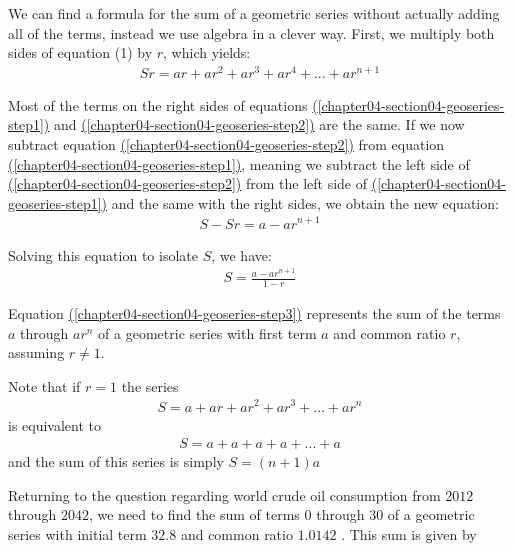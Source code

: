 \documentclass[10pt,]{book}
\theoremstyle{plain}
\theoremstyle{definition}
\theoremstyle{definition}
\theoremstyle{definition}
\numberwithin{equation}{section}
\begin{document}
\par
We can find a formula for the sum of a geometric series without actually adding all of the terms, instead we use algebra in a clever way.  First, we multiply both sides of equation (1) by \(r\), which yields:%
\begin{gather}
Sr = ar + ar^2 + ar^3 + ar^4 + ... + ar^{n+1}\label{chapter04-section04-geoseries-step2}
\end{gather}
%
\par
Most of the terms on the right sides of equations \hyperref[chapter04-section04-geoseries-step1]{(\ref{chapter04-section04-geoseries-step1})} and \hyperref[chapter04-section04-geoseries-step2]{(\ref{chapter04-section04-geoseries-step2})} are the same.  If we now subtract equation \hyperref[chapter04-section04-geoseries-step2]{(\ref{chapter04-section04-geoseries-step2})} from equation \hyperref[chapter04-section04-geoseries-step1]{(\ref{chapter04-section04-geoseries-step1})}, meaning we subtract the left side of \hyperref[chapter04-section04-geoseries-step2]{(\ref{chapter04-section04-geoseries-step2})} from the left side of \hyperref[chapter04-section04-geoseries-step1]{(\ref{chapter04-section04-geoseries-step1})} and the same with the right sides, we obtain the new equation:%
\begin{gather*}
S-Sr = a - ar^{n+1}
\end{gather*}
%
\par
Solving this equation to isolate \(S\), we have:%
\begin{gather}
S = \frac{a-ar^{n+1}}{1-r}\label{chapter04-section04-geoseries-step3}
\end{gather}
%
\par
Equation \hyperref[chapter04-section04-geoseries-step3]{(\ref{chapter04-section04-geoseries-step3})} represents the sum of the terms \(a\) through \(ar^n\) of a geometric series with first term \(a\) and common ratio \(r\), assuming \(r \neq 1\).%
\par
Note that if \(r=1\) the series%
\begin{gather*}
S = a + ar + ar^2 + ar^3 + ... + ar^n
\end{gather*}
is equivalent to%
\begin{gather*}
S = a + a + a + a + ... + a
\end{gather*}
and the sum of this series is simply \(S=(n+1)a\)%
\par
Returning to the question regarding world crude oil consumption from \(2012\) through \(2042\), we need to find the sum of terms \(0\) through \(30\) of a geometric series with initial term \(32.8\) and common ratio \(1.0142\) .  This sum is given by%
\end{document}
